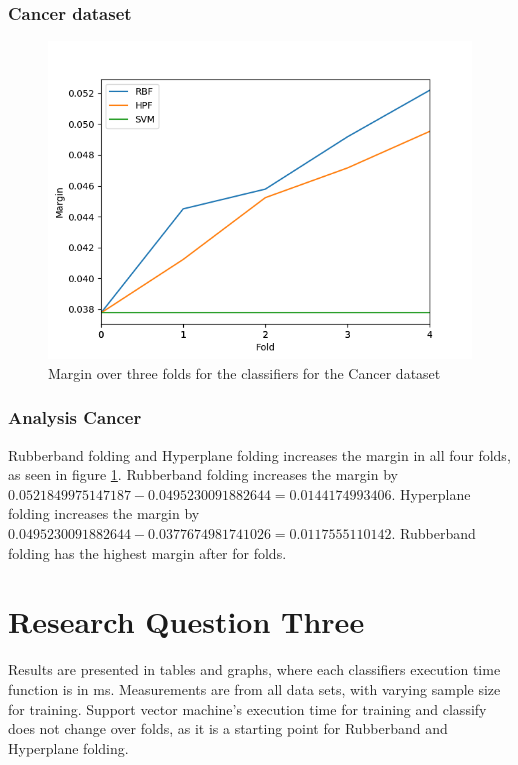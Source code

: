 \documentclass[a4paper,twoside]{bth}
\begin{document}
\subsubsection{Cancer dataset}
\begin{figure}[!htb]
\centering
\includegraphics[scale=0.7]{images/result-cancer/Margin.png}
   \caption{Margin over three folds for the classifiers for the Cancer dataset}
   \label{fig:cancer-margin}
\end{figure}

\subsubsection{Analysis Cancer}
Rubberband folding and Hyperplane folding increases the margin in all four folds, as seen in figure \ref{fig:cancer-margin}. Rubberband folding increases the margin by $0.0521849975147187 - 0.0495230091882644 = 0.0144174993406$. Hyperplane folding increases the margin by $0.0495230091882644 - 0.0377674981741026 = 0.0117555110142$. Rubberband folding has the highest margin after for folds.



\clearpage





\section{Research Question Three}
Results are presented in tables and graphs, where each classifiers execution time function is in ms.  Measurements are from all data sets, with varying sample size for training. Support vector machine's execution time for training and classify does not change over folds, as it is a starting point for Rubberband and Hyperplane folding. 
\FloatBarrier
\end{document}
